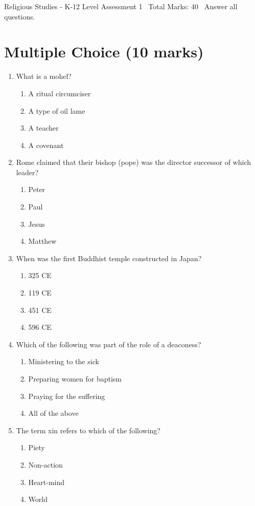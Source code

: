 \documentclass[12pt]{article}
\begin{document}
\begin{center}
Religious Studies - K-12 Level Assessment 1 \
Total Marks: 40 \
Answer all questions.
\end{center}

\section*{Multiple Choice (10 marks)}
\begin{enumerate}[label=\arabic*.]
\item What is a mohel?
\begin{enumerate}[label=(\alph*)]
    \item A ritual circumciser
    \item A type of oil lame
    \item A teacher
    \item A covenant
\end{enumerate}
\item Rome claimed that their bishop (pope) was the director successor of which leader?
\begin{enumerate}[label=(\alph*)]
    \item Peter
    \item Paul
    \item Jesus
    \item Matthew
\end{enumerate}
\item When was the first Buddhist temple constructed in Japan?
\begin{enumerate}[label=(\alph*)]
    \item 325 CE
    \item 119 CE
    \item 451 CE
    \item 596 CE
\end{enumerate}
\item Which of the following was part of the role of a deaconess?
\begin{enumerate}[label=(\alph*)]
    \item Ministering to the sick
    \item Preparing women for baptism
    \item Praying for the suffering
    \item All of the above
\end{enumerate}
\item The term xin refers to which of the following?
\begin{enumerate}[label=(\alph*)]
    \item Piety
    \item Non-action
    \item Heart-mind
    \item World
\end{enumerate}
\end{enumerate}
\end{document}
